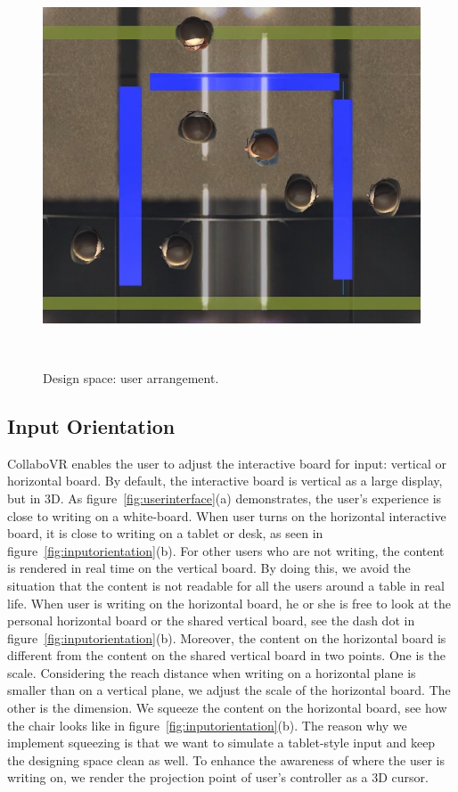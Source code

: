\documentclass{sigchi}
\begin{document}
\begin{figure}[t!]
 \includegraphics[width=0.45\columnwidth]{Figure3-6.png}
 \caption{Design space: user arrangement.
 }~\label{fig:userarrangement}
\end{figure}

\subsection{Input Orientation}
CollaboVR enables the user to adjust the interactive board for input: vertical or horizontal board. By default, the interactive board is vertical as a large display, but in 3D. As figure~\ref{fig:userinterface}(a) demonstrates, the user's experience is close to writing on a white-board. When user turns on the horizontal interactive board, it is close to writing on a tablet or desk, as seen in figure~\ref{fig:inputorientation}(b). For other users who are not writing, the content is rendered in real time on the vertical board. By doing this, we avoid the situation that the content is not readable for all the users around a table in real life. When user is writing on the horizontal board, he or she is free to look at the personal horizontal board or the shared vertical board, see the dash dot in figure~\ref{fig:inputorientation}(b). Moreover, the content on the horizontal board is different from the content on the shared vertical board in two points. One is the scale. Considering the reach distance when writing on a horizontal plane is smaller than on a vertical plane, we adjust the scale of the horizontal board. The other is the dimension. We squeeze the content on the horizontal board, see how the chair looks like in figure~\ref{fig:inputorientation}(b). The reason why we implement squeezing is that we want to simulate a tablet-style input and keep the designing space clean as well. To enhance the awareness of where the user is writing on, we render the projection point of user's controller as a 3D cursor.
\end{document}
